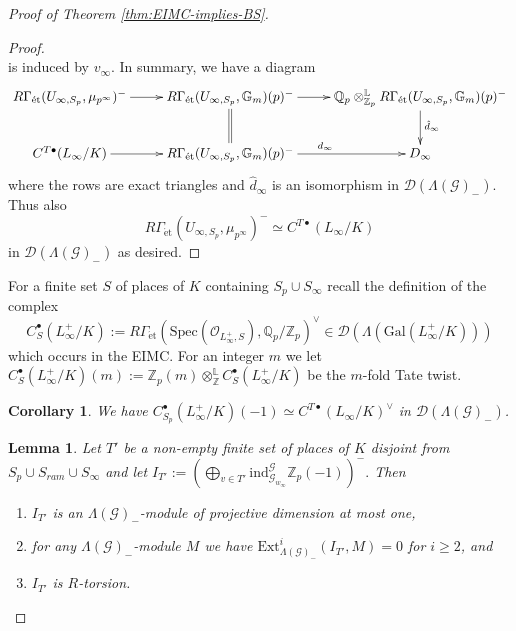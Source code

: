 \documentclass[12pt]{amsart}
\theoremstyle{plain}
\newtheorem{lemma}[theorem]{Lemma}
\newtheorem{corollary}[theorem]{Corollary}
\theoremstyle{remark}
\theoremstyle{definition}
\numberwithin{equation}{section}
\begin{document}
{\begin{proof}[Proof of Theorem \ref{thm:EIMC-implies-BS}]
\begin{proof}
\[\]
is induced by $v_{\infty}$.
In summary, we have a diagram
\[
\xymatrix{
{R\Gamma_{\mathrm{\acute{e}t}}(U_{\infty, S_{p}}, \mu_{p^{\infty}})^{-}} \ar[r] &
R\Gamma_{\mathrm{\acute{e}t}}(U_{\infty, S_{p}}, \mathbb{G}_{m})(p)^{-} \ar[r] \ar@{=}[d] &
{\mathbb{Q}}_{p} \otimes_{{\mathbb{Z}}_{p}}^{\mathbb{L}} R\Gamma_{\mathrm{\acute{e}t}}(U_{\infty, S_{p}}, \mathbb{G}_{m})(p)^{-} \ar[d]^{\hat{d}_{\infty}} \\
{C^{T \bullet}(L_{\infty}/K)} \ar[r] &
R\Gamma_{\mathrm{\acute{e}t}}(U_{\infty, S_{p}}, \mathbb{G}_{m})(p)^{-} \ar[r]^{d_{\infty}} & D_{\infty}
}\]
where the rows are exact triangles and $\hat{d}_{\infty}$ is an isomorphism in $\mathcal{D}(\Lambda(\mathcal{G})_{-})$.
Thus also
\[
R\Gamma_{\mathrm{\acute{e}t}}(U_{\infty, S_{p}}, \mu_{p^{\infty}})^{-} \simeq C^{T \bullet}(L_{\infty}/K)
\]
in $\mathcal{D}(\Lambda(\mathcal{G})_{-})$ as desired.
 \end{proof}

For a finite set $S$ of places of $K$ containing $S_{p} \cup S_{\infty}$ recall the definition of the complex
\[
C_{S}^{\bullet}(L_{\infty}^{+}/K) := R\Gamma_{\mathrm{\acute{e}t}}({\mathrm{Spec}}(\mathcal{O}_{L_{\infty}^{+},S}), {\mathbb{Q}}_{p} / {\mathbb{Z}}_{p})^{\vee}
\in \mathcal{D}(\Lambda({\mathrm{Gal}}(L_{\infty}^{+}/K)))
\]
which occurs in the EIMC. 
For an integer $m$ we let $C_{S}^{\bullet}(L_{\infty}^{+}/K)(m) := {\mathbb{Z}}_{p}(m) \otimes^{\mathbb{L}}_{\mathbb{Z}} C_{S}^{\bullet}(L_{\infty}^{+}/K)$
be the $m$-fold Tate twist.

\begin{corollary}\label{cor:isom-cT-complex}
We have $C_{S_{p}}^{\bullet}(L_{\infty}^{+}/K)(-1) \simeq C^{T \bullet}(L_{\infty}/K)^{\vee}$ in $\mathcal{D}(\Lambda(\mathcal{G})_{-})$. 
\end{corollary}

\begin{lemma}\label{lem:IT-proj-dim-at-most-one}
Let $T'$ be a non-empty finite set of places of $K$ disjoint from $S_{p} \cup S_{ram} \cup S_{\infty}$
and let 
$
I_{T'}:=\left( \bigoplus_{v\in T'} {\mathrm{ind}}_{\mathcal{G}_{w_{\infty}}}^{\mathcal{G}} {\mathbb{Z}}_{p}(-1)\right)^{-}.
$
Then 
\begin{enumerate}
\item $I_{T'}$ is an $\Lambda(\mathcal{G})_{-}$-module of projective dimension at most one,
\item for any $\Lambda(\mathcal{G})_{-}$-module $M$ we have ${\mathrm{Ext}}^{i}_{\Lambda(\mathcal{G})_{-}} (I_{T'}, M)=0$ for $i \geq 2$, and
\item $I_{T'}$ is $R$-torsion.
\end{enumerate}
\end{lemma}


\end{proof}}
\end{document}
